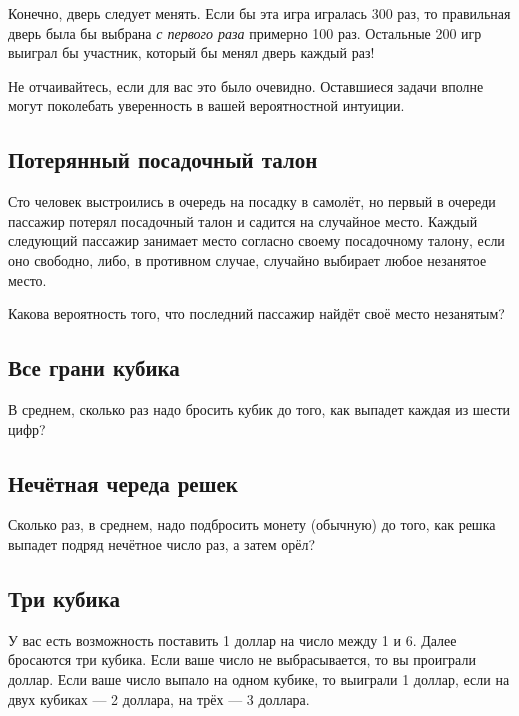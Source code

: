 Конечно, дверь следует менять.
Если бы эта игра игралась 300 раз, то правильная дверь была бы выбрана \emph{с первого раза} примерно 100 раз.
Остальные 200 игр выиграл бы участник, который бы менял дверь каждый раз!

\medskip

Не отчаивайтесь, если для вас это было очевидно.
Оставшиеся задачи вполне могут поколебать уверенность в вашей вероятностной интуиции.

\subsection*{Потерянный посадочный талон}%

Сто человек выстроились в очередь на посадку в самолёт, но первый в очереди пассажир потерял посадочный талон и садится на случайное место.
Каждый следующий пассажир занимает место согласно своему посадочному талону, если оно свободно, либо, в противном случае, случайно выбирает любое незанятое место.

\medskip

Какова вероятность того, что последний пассажир найдёт своё место незанятым?

\subsection*{Все грани кубика}%

В среднем, сколько раз надо бросить кубик до того, как выпадет каждая из шести цифр?

\subsection*{Нечётная череда решек}%

Сколько раз, в среднем, надо подбросить монету (обычную) до того, как решка выпадет подряд нечётное число раз, а затем орёл? 

\subsection*{Три кубика}%

У вас есть возможность поставить 1 доллар на число между 1 и 6.
Далее бросаются три кубика.
Если ваше число не выбрасывается, то вы проиграли доллар.
Если ваше число выпало на одном кубике, то выиграли 1 доллар, если на двух кубиках --- 2 доллара, на трёх --- 3 доллара.

